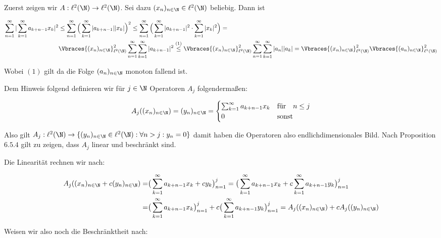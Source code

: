 \begin{solution}

Zuerst zeigen wir $A: \ell^2(\N) \rightarrow \ell^2(\N)$. Sei dazu $(x_n)_{n \in \N} \in \ell^2(\N)$
beliebig. Dann ist

\begin{align*}
  \sum_{n=1}^\infty |\sum_{k=1}^\infty a_{k+n-1}x_k|^2 &\leq
  \sum_{n=1}^\infty \Big( \sum_{k=1}^\infty |a_{k+n-1}| |x_k|\Big)^2 \leq
  \sum_{n=1}^\infty \Big( \sum_{k=1}^\infty |a_{k+n-1}|^2 \cdot \sum_{k=1}^\infty |x_k|^2\Big) = \\
  & \Vbraces{(x_n)_{n \in \N}}_{\ell^2(\N)}^2 \sum_{n=1}^\infty \sum_{k=1}^\infty |a_{k+n-1}|^2 \stackrel{(1)}{\leq}
  \Vbraces{(x_n)_{n \in \N}}_{\ell^2(\N)}^2 \sum_{n=1}^\infty \sum_{k=1}^\infty |a_n| |a_k| =
  \Vbraces{(x_n)_{n \in \N}}_{\ell^2(\N)}^2 \Vbraces{(a_n)_{n \in \N}}_{\ell^1(\N)}^2
\end{align*}

Wobei $(1)$ gilt da die Folge $(a_n)_{n \in \N}$ monoton fallend ist.

Dem Hinweis folgend definieren wir für $j \in \N$ Operatoren $A_j$ folgendermaßen:

\begin{align*}
  A_j((x_n)_{n\in \N}) = (y_n)_{n \in \N} = \begin{cases}
  \sum_{k=1}^{\infty} a_{k+n-1}x_k & \text{für} \quad n \leq j \\
  0 & \text{sonst}
  \end{cases}
\end{align*}

Also gilt $A_j: \ell^2(\N) \rightarrow \{(y_n)_{n \in \N} \in \ell^2(\N): \forall n > j:
y_n = 0\}$ damit haben die Operatoren also endlichdimensionales Bild. Nach Proposition
$6.5.4$ gilt zu zeigen, dass $A_j$ linear und beschränkt sind.

Die Linearität rechnen wir nach:

\begin{align*}
  A_j((x_n)_{n \in \N} + c (y_n)_{n \in \N}) =& \big(\sum_{k=1}^{\infty}a_{k+n-1}
  x_k+c y_k \big)_{n=1}^j = \big(\sum_{k=1}^{\infty}a_{k+n-1}
  x_k+ c \sum_{k=1}^{\infty}a_{k+n-1}y_k \big)_{n=1}^j\\
  =&\big(\sum_{k=1}^{\infty}a_{k+n-1}
  x_k \big)_{n=1}^j + c\big(\sum_{k=1}^\infty a_{k+n-1}y_k \big)_{n=1}^j
  = A_j((x_n)_{n \in \N})+ c A_j((y_n)_{n \in \N})
\end{align*}

Weisen wir also noch die Beschränktheit nach:


\end{solution}
